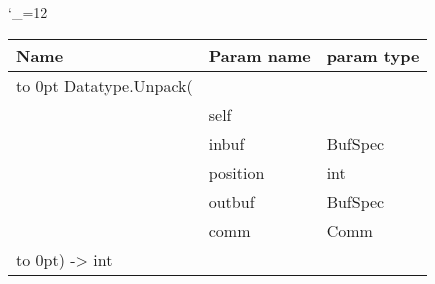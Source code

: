 \begingroup \catcode`\_=12 \tt
\begin{tabular}{lll}
\toprule
\textrm{Name}&\textrm{Param name}&\textrm{param type}\\
\midrule
\hbox to 0pt {Datatype.Unpack(\hss}\\
& self\\
& inbuf & BufSpec\\
& position & int\\
& outbuf & BufSpec\\
& comm & Comm\\
\hbox to 0pt{) -> int\hss}\\
\bottomrule
\end{tabular}
\endgroup
